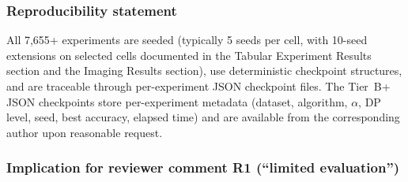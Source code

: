 \documentclass[conference]{IEEEtran}
\begin{document}
\begin{table}[htbp]
\centering
\caption{Coverage of the (non-IID $\alpha$, privacy DP) configuration grid across pre-rebuttal and post-rebuttal phases. Tier B+ extends the grid to extreme non-IID $\alpha{=}0.05$ (the most adversarial regime).}
\label{tab:tier_b_budget_grid}
\small
{}
\end{table}

\subsubsection*{Reproducibility statement}

All 7{,}655+ experiments are seeded (typically 5 seeds per cell, with 10-seed extensions on selected cells documented in the Tabular Experiment Results section and the Imaging Results section), use deterministic checkpoint structures, and are traceable through per-experiment JSON checkpoint files. The Tier~B+ JSON checkpoints store per-experiment metadata (dataset, algorithm, $\alpha$, DP level, seed, best accuracy, elapsed time) and are available from the corresponding author upon reasonable request.

\subsubsection*{Implication for reviewer comment R1 (``limited evaluation'')}
\end{document}
